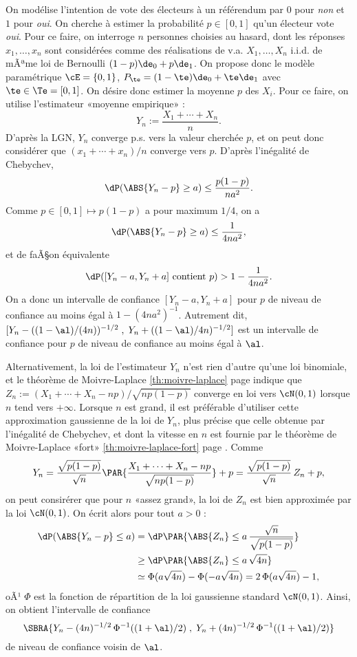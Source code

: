 On modélise l'intention de vote des électeurs à un référendum par $0$ pour
\emph{non} et $1$ pour \emph{oui}. On cherche à estimer la probabilité
$p\in[0,1]$ qu'un électeur vote \emph{oui}. Pour ce faire, on interroge $n$
personnes choisies au hasard, dont les réponses $x_1,\ldots,x_n$ sont
considérées comme des réalisations de v.a. $X_1,\ldots,X_n$ i.i.d. de mÃªme loi
de Bernoulli $(1-p)\de_0+p\de_1$. On propose donc le modèle paramétrique
$\cE=\{0,1\}$, $P_\te=(1-\te)\de_0+\te\de_1$ avec $\te\in\Te=[0,1]$. On désire
donc estimer la moyenne $p$ des $X_i$. Pour ce faire, on utilise l'estimateur
«moyenne empirique» :
$$
Y_n:=\frac{X_1+\cdots+X_n}{n}.
$$
D'après la LGN, $Y_n$ converge p.s. vers la valeur cherchée $p$, et on peut
donc considérer que $(x_1+\cdots+x_n)/n$ converge vers $p$.  D'après
l'inégalité de Chebychev,
$$
\dP(\ABS{Y_n-p} \geq a) \leq \frac{p(1-p)}{na^2}.
$$
Comme $p\in[0,1]\mapsto p(1-p)$ a pour maximum
$1/4$, on a
$$
\dP(\ABS{Y_n-p} \geq a) \leq \frac{1}{4na^2},
$$
et de faÃ§on équivalente
$$
\dP([Y_n-a,Y_n+a] \text{ contient } p) > 1-\frac{1}{4na^2}.
$$
On a donc un intervalle de confiance $[Y_n-a,Y_n+a]$ pour $p$ de niveau de
confiance au moins égal à $1-(4na^2)^{-1}$. Autrement dit,
$[Y_n-((1-\al)/(4n))^{-1/2}\;,\;Y_n+((1-\al)/4n)^{-1/2}]$ est un intervalle de
confiance pour $p$ de niveau de confiance au moins égal à $\al$.

Alternativement, la loi de l'estimateur $Y_n$ n'est rien d'autre qu'une loi
binomiale, et le théorème de Moivre-Laplace \ref{th:moivre-laplace} page
\pageref{th:moivre-laplace} indique que
$Z_n:=(X_1+\cdots+X_n-np)/\sqrt{np(1-p)}$ converge en loi vers $\cN(0,1)$
lorsque $n$ tend vers $+\infty$. Lorsque $n$ est grand, il est préférable
d'utiliser cette approximation gaussienne de la loi de $Y_n$, plus précise que
celle obtenue par l'inégalité de Chebychev, et dont la vitesse en $n$ est
fournie par le théorème de Moivre-Laplace «fort» \ref{th:moivre-laplace-fort}
page \pageref{th:moivre-laplace-fort}. Comme
$$
Y_n=\frac{\sqrt{p(1-p)}}{\sqrt{n}}\PAR{\frac{X_1+\cdots+X_n-np}{\sqrt{np(1-p)}}}+p
=\frac{\sqrt{p(1-p)}}{\sqrt{n}}\,Z_n+p,
$$
on peut consirérer que pour $n$ «assez grand», la loi de $Z_n$ est bien
approximée par la loi $\cN(0,1)$. On écrit alors pour tout $a>0$ :
\begin{align*}
  \dP(\ABS{Y_n-p} \leq a) 
  &= \dP\PAR{\ABS{Z_n} \leq a\,\frac{\sqrt{n}}{\sqrt{p(1-p)}}}\\
  &\geq \dP\PAR{\ABS{Z_n} \leq a\,\sqrt{4n}} \\
  &\simeq \Phi(a\sqrt{4n})-\Phi(-a\sqrt{4n}) = 2\,\Phi(a\sqrt{4n})-1,
\end{align*}
oÃ¹ $\Phi$ est la fonction de répartition de la loi gaussienne standard
$\cN(0,1)$. Ainsi, on obtient l'intervalle de confiance
$$
\SBRA{Y_n-(4n)^{-1/2}\,\Phi^{-1}((1+\al)/2)\;,\;Y_n+(4n)^{-1/2}\,\Phi^{-1}((1+\al)/2)}
$$
de niveau de confiance voisin de $\al$.

